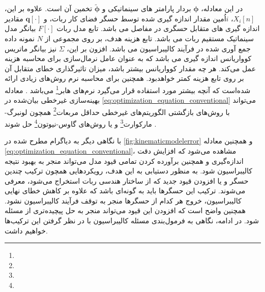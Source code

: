 در این معادله، $\boldsymbol{\phi}$ بردار پارامتر های سینماتیکی و $\tilde{\boldsymbol{\phi}}$ تخمین آن است. علاوه بر این، $X_i[n]$، 
$i$اُمین
مقدار اندازه گیری شده توسط حسگر فضای کار ربات، و $\boldsymbol{q}[\cdot]$ مقادیر اندازه گیری های متقابل حسگری در مفاصل می باشد. تابع مدل ربات $F[\cdot]$ بیانگر مدل سینماتیک مستقیم ربات می باشد. تابع هزینه هدف، بر روی مجموعی از $N$ نمونه داده جمع آوری شده در فرآیند کالیبراسیون می باشد. افزون بر این، $\Sigma$ نیز بیانگر ماتریس کوواریانس اندازه گیری می باشد که به عنوان عامل نرمال‌سازی برای محاسبه هزینه عمل می‌کند. هر چه مقدار کوواریانس بیشتر باشد، میزان تاثیر‌گذاری خطای متقابل آن بر روی تابع هزینه کمتر خواهد‌بود. همچنین برای محاسبه نرم روش‌های زیادی ارائه شده‌است که آنچه بیشتر مورد استفاده قرار می‌گیرد نرم‌های هابر\footnote{}
می‌باشد
\cite{chang2015huber}.
معادله بهینه‌سازی غیر‌خطی بیان‌شده در 
\ref{eq:optimization_equation_conventional}
می‌تواند با روش‌های بازگشتی الگوریتم‌های غیر‌خطی حداقل مربعات\footnote{}
همچون لونبرگ-مارکوارت\footnote{}
و یا روش‌های گاوس-نیوتون\footnote{}
حل شوند
\cite{dellart_robot_perception}.

با نگاهی دیگر به دیاگرام مطرح شده در 
\ref{fig:kinematicmodelerror}
و همچنین معادله 
\ref{eq:optimization_equation_conventional}،
مشاهده می‌شود که افزایش دقت اندازه‌گیری و همچنین برآورده کردن تمامی قیود مدل می‌تواند منجر به بهبود نتیجه کالیبراسیون شود. به منظور دستیابی به این هدف، رویکردهایی همچون ترکیب چندین حسگر و یا افزودن قیود جدید که از ساختار هندسی ربات استخراج می‌شود، معرفی می‌شوند. ترکیب این حسگرها باید به گونه‌ای باشد که علاوه بر کاهش خطای نهایی کالیبراسیون، خروج هر کدام از حسگرها منجر به توقف فرآیند کالیبراسیون نشود. همچنین واضح است که افزودن این قیود می‌تواند منجر به حل پیچیده‌تری از مسئله شود. در ادامه، نگاهی به فرمول‌بندی مسئله کالیبراسیون با در نظر گرفتن این ترکیب‌ها خواهیم داشت.

